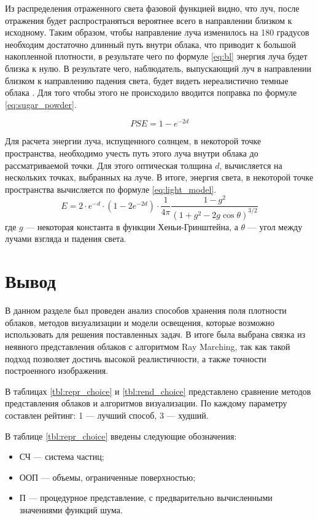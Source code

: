 Из распределения отраженного света фазовой функцией видно, что луч, после отражения будет распространяться вероятнее всего в направлении близком к исходному. 
Таким образом, чтобы направление луча изменилось на 180 градусов необходим достаточно длинный путь внутри облака, что приводит к большой накопленной плотности, в результате чего по формуле \ref{eq:bl} энергия луча будет близка к нулю. 
В результате чего, наблюдатель, выпускающий луч в направлении близком к направлению падения света, будет видеть нереалистично темные облака \cite{hzd}. Для того чтобы этого не происходило вводится поправка по формуле \eqref{eq:sugar_powder}.

\begin{equation}
	\label{eq:sugar_powder}
	PSE = 1 - e ^ {-2 d}
\end{equation}

Для расчета энергии луча, испущенного солнцем, в некоторой точке пространства, необходимо учесть путь этого луча внутри облака до рассматриваемой точки.
Для этого оптическая толщина $d$, вычисляется на нескольких точках, выбранных на луче.
В итоге, энергия света, в некоторой точке пространства вычисляется по формуле \eqref{eq:light_model}.
\begin{equation}
	\label{eq:light_model}
	E = 2 \cdot e ^ {-d} \cdot (1 - 2 e ^ {-2d}) \cdot \frac{1}{4\pi} \frac{1 - g^2}{(1 + g^2 - 2g\cos \theta)^{3/2}}
\end{equation}
где $ g $ --- некоторая константа в функции Хеньи-Гринштейна, а $ \theta $ --- угол между лучами взгляда и падения света.


\section*{Вывод}

В данном разделе был проведен анализ способов хранения поля плотности облаков, методов визуализации и модели освещения, которые возможно использовать для решения поставленных задач. В итоге была выбрана связка из неявного представления облаков с алгоритмом Ray Marching, так как такой подход позволяет достичь высокой реалистичности, а также точности построенного изображения. 

В таблицах \ref{tbl:repr_choice} и \ref{tbl:rend_choice} представлено сравнение методов представления облаков и алгоритмов визуализации. По каждому параметру составлен рейтинг: 1 --- лучший способ, 3 --- худший.

В таблице \ref{tbl:repr_choice} введены следующие обозначения:
\begin{itemize}
	\item СЧ --- система частиц;
	\item ООП --- объемы, ограниченные поверхностью;
	\item П --- процедурное представление, с предварительно вычисленными значениями функций шума.
\end{itemize} 

